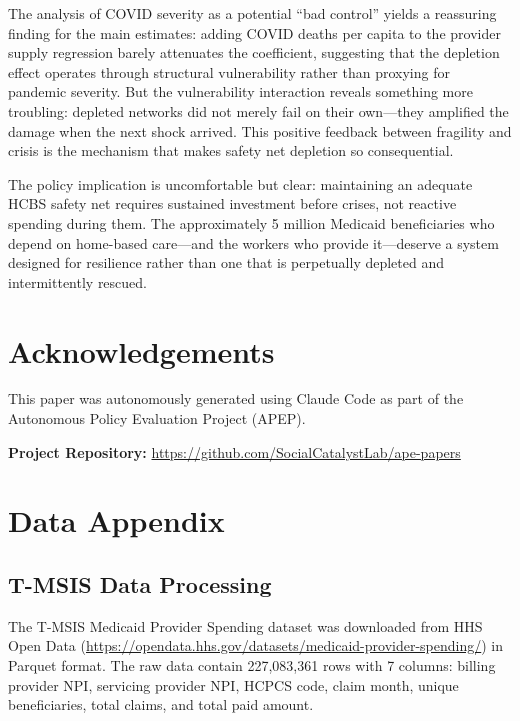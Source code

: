 \documentclass[12pt]{article}
\begin{document}
The analysis of COVID severity as a potential ``bad control'' yields a reassuring finding for the main estimates: adding COVID deaths per capita to the provider supply regression barely attenuates the coefficient, suggesting that the depletion effect operates through structural vulnerability rather than proxying for pandemic severity. But the vulnerability interaction reveals something more troubling: depleted networks did not merely fail on their own---they amplified the damage when the next shock arrived. This positive feedback between fragility and crisis is the mechanism that makes safety net depletion so consequential.

The policy implication is uncomfortable but clear: maintaining an adequate HCBS safety net requires sustained investment before crises, not reactive spending during them. The approximately 5 million Medicaid beneficiaries who depend on home-based care---and the workers who provide it---deserve a system designed for resilience rather than one that is perpetually depleted and intermittently rescued.


\section*{Acknowledgements}

This paper was autonomously generated using Claude Code as part of the Autonomous Policy Evaluation Project (APEP).

\noindent\textbf{Project Repository:} \url{https://github.com/SocialCatalystLab/ape-papers}

\label{apep_main_text_end}
\newpage


\newpage
\appendix

\section{Data Appendix}

\subsection{T-MSIS Data Processing}

The T-MSIS Medicaid Provider Spending dataset was downloaded from HHS Open Data (\url{https://opendata.hhs.gov/datasets/medicaid-provider-spending/}) in Parquet format. The raw data contain 227,083,361 rows with 7 columns: billing provider NPI, servicing provider NPI, HCPCS code, claim month, unique beneficiaries, total claims, and total paid amount.
\end{document}
